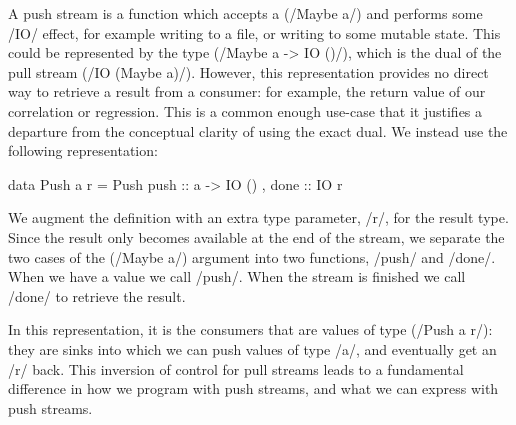 A push stream is a function which accepts a (\Hs/Maybe a/) and performs some \Hs/IO/ effect, for example writing to a file, or writing to some mutable state.
This could be represented by the type (\Hs/Maybe a -> IO ()/), which is the dual of the pull stream (\Hs/IO (Maybe a)/).
However, this representation provides no direct way to retrieve a result from a consumer: for example, the return value of our correlation or regression.
This is a common enough use-case that it justifies a departure from the conceptual clarity of using the exact dual.
We instead use the following representation:

\begin{haskell}
data Push a r = Push
  { push :: a -> IO ()
  , done :: IO r }
\end{haskell}

We augment the definition with an extra type parameter, \Hs/r/, for the result type.
Since the result only becomes available at the end of the stream, we separate the two cases of the (\Hs/Maybe a/) argument into two functions, \Hs/push/ and \Hs/done/.
When we have a value we call \Hs/push/.
When the stream is finished we call \Hs/done/ to retrieve the result.




In this representation, it is the consumers that are values of type (\Hs/Push a r/): they are sinks into which we can push values of type \Hs/a/, and eventually get an \Hs/r/ back.
This inversion of control for pull streams leads to a fundamental difference in how we program with push streams, and what we can express with push streams.

